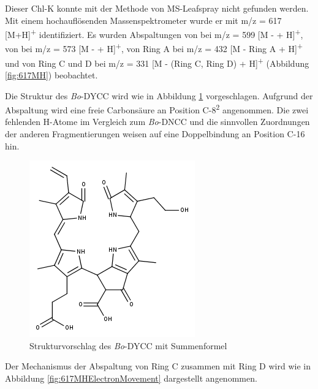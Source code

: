 Dieser \gls{Chl-K} konnte mit der Methode von MS-Leafspray nicht gefunden werden. Mit einem hochauflösenden Massenspektrometer wurde er mit m/z = 617 [M+H]\textsuperscript{+} identifiziert. Es wurden Abspaltungen von  bei m/z = 599 [M -  + H]\textsuperscript{+}, von  bei m/z = 573 [M -  + H]\textsuperscript{+}, von Ring A bei m/z = 432 [M - Ring A + H]\textsuperscript{+} und von Ring C und D bei m/z = 331 [M - (Ring C, Ring D) + H]\textsuperscript{+} (Abbildung \ref{fig:617MH}) beobachtet.

Die Struktur des \textit{Bo}-DYCC  wird wie in Abbildung \ref{fig:617MHStruktur} vorgeschlagen. Aufgrund der  Abspaltung wird eine freie Carbonsäure an Position C-8\textsuperscript{2} angenommen. Die zwei fehlenden H-Atome im Vergleich zum \textit{Bo}-DNCC und die sinnvollen Zuordnungen der anderen Fragmentierungen weisen auf eine Doppelbindung an Position C-16 hin.  

\begin{figure}[!htbp]
  \centering
  \includegraphics[scale=0.6]{figures/Kapitel7/Kataboliten/fragmentation_structures/VWA_Katabolit_617.png}
  \caption[Strukturvorschlag des \textit{Bo}-DYCC, Quelle: Autor]{Strukturvorschlag des \textit{Bo}-DYCC mit Summenformel }
  \label{fig:617MHStruktur}
\end{figure}

Der Mechanismus der Abspaltung von Ring C zusammen mit Ring D wird wie in Abbildung \ref{fig:617MHElectronMovement} dargestellt angenommen. 

